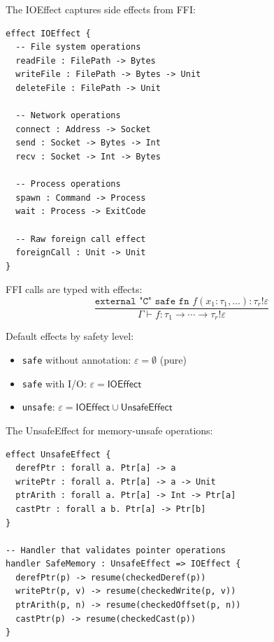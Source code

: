 \begin{definition}[IOEffect]
\label{def:io-effect}
The \textsf{IOEffect} captures side effects from FFI:
\begin{verbatim}
effect IOEffect {
  -- File system operations
  readFile : FilePath -> Bytes
  writeFile : FilePath -> Bytes -> Unit
  deleteFile : FilePath -> Unit

  -- Network operations
  connect : Address -> Socket
  send : Socket -> Bytes -> Int
  recv : Socket -> Int -> Bytes

  -- Process operations
  spawn : Command -> Process
  wait : Process -> ExitCode

  -- Raw foreign call effect
  foreignCall : Unit -> Unit
}
\end{verbatim}
\end{definition}

\begin{definition}
\label{def:ffi-effect-inference}
FFI calls are typed with effects:
\[
\frac{\texttt{external "C" safe fn } f(x_1: \tau_1, \ldots) : \tau_r \mathbin{!} \varepsilon}
     {\Gamma \vdash f : \tau_1 \to \cdots \to \tau_r \mathbin{!} \varepsilon}
\]

Default effects by safety level:
\begin{itemize}
  \item \texttt{safe} without annotation: $\varepsilon = \emptyset$ (pure)
  \item \texttt{safe} with I/O: $\varepsilon = \mathsf{IOEffect}$
  \item \texttt{unsafe}: $\varepsilon = \mathsf{IOEffect} \cup \mathsf{UnsafeEffect}$
\end{itemize}
\end{definition}

\begin{definition}[UnsafeEffect]
\label{def:unsafe-effect}
The \textsf{UnsafeEffect} for memory-unsafe operations:
\begin{verbatim}
effect UnsafeEffect {
  derefPtr : forall a. Ptr[a] -> a
  writePtr : forall a. Ptr[a] -> a -> Unit
  ptrArith : forall a. Ptr[a] -> Int -> Ptr[a]
  castPtr : forall a b. Ptr[a] -> Ptr[b]
}

-- Handler that validates pointer operations
handler SafeMemory : UnsafeEffect => IOEffect {
  derefPtr(p) -> resume(checkedDeref(p))
  writePtr(p, v) -> resume(checkedWrite(p, v))
  ptrArith(p, n) -> resume(checkedOffset(p, n))
  castPtr(p) -> resume(checkedCast(p))
}
\end{verbatim}
\end{definition}

